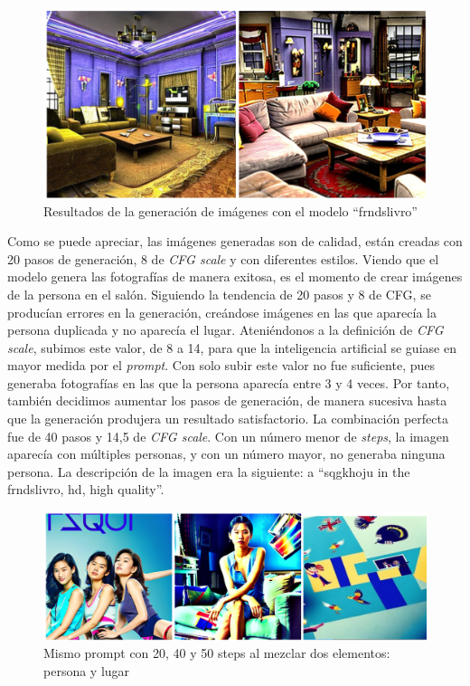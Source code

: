 \begin{figure}[!htb]
	\centering
	\includegraphics[width = 1
	\textwidth]{Imagenes/Vectorial/resultadosfrndslivro.png}
	\caption{Resultados de la generación de imágenes con el modelo ``frndslivro''}
	\label{fig:resultsfrnds}
\end{figure}

Como se puede apreciar, las imágenes generadas son de calidad, están creadas con 20 pasos de generación, 8 de \textit{CFG scale} y con diferentes estilos. Viendo que el modelo genera las fotografías de manera exitosa, es el momento de crear imágenes de la persona en el salón. Siguiendo la tendencia de 20 pasos y 8 de CFG, se producían errores en la generación, creándose imágenes en las que aparecía la persona duplicada y no aparecía el lugar. Ateniéndonos a la definición de \textit{CFG scale}, subimos este valor, de 8 a 14, para que la inteligencia artificial se guiase en mayor medida por el \textit{prompt}. Con solo subir este valor no fue suficiente, pues generaba fotografías en las que la persona aparecía entre 3 y 4 veces. Por tanto, también decidimos aumentar los pasos de generación, de manera sucesiva hasta que la generación produjera un resultado satisfactorio. La combinación perfecta fue de 40 pasos y 14,5 de \textit{CFG scale}. Con un número menor de \textit{steps}, la imagen aparecía con múltiples personas, y con un número mayor, no generaba ninguna persona. La descripción de la imagen era la siguiente: a ``sqgkhoju in the frndslivro, hd, high quality''.\\

\begin{figure}[!htb]
	\centering
	\includegraphics[width = 1
	\textwidth]{Imagenes/Vectorial/resultadoshojuyfrnds.png}
	\caption{Mismo prompt con 20, 40 y 50 steps al mezclar dos elementos: persona y lugar}
	\label{fig:comphachi}
\end{figure}


